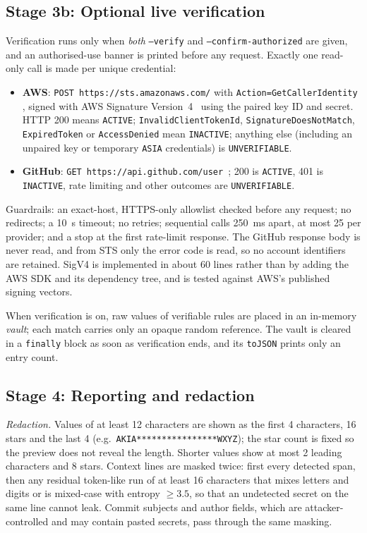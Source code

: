 \documentclass[conference]{IEEEtran}
\newcommand{\code}[1]{\texttt{#1}}
\begin{document}
\subsection{Stage 3b: Optional live verification}
Verification runs only when \emph{both} \code{--verify} and \code{--confirm-authorized} are given,
and an authorised-use banner is printed before any request. Exactly one read-only call is made per
unique credential:
\begin{itemize}
\item \textbf{AWS}: \code{POST https://sts.amazonaws.com/} with \code{Action=GetCallerIdentity}
  \cite{awssts}, signed with AWS Signature Version~4~\cite{awssigv4} using the paired key ID and
  secret. HTTP 200 means \code{ACTIVE}; \code{InvalidClientTokenId}, \code{SignatureDoesNotMatch},
  \code{ExpiredToken} or \code{AccessDenied} mean \code{INACTIVE}; anything else (including an
  unpaired key or temporary \code{ASIA} credentials) is \code{UNVERIFIABLE}.
\item \textbf{GitHub}: \code{GET https://api.github.com/user}~\cite{ghusers}; 200 is
  \code{ACTIVE}, 401 is \code{INACTIVE}, rate limiting and other outcomes are \code{UNVERIFIABLE}.
\end{itemize}
Guardrails: an exact-host, HTTPS-only allowlist checked before any request; no redirects; a 10~s
timeout; no retries; sequential calls 250~ms apart, at most 25 per provider; and a stop at the
first rate-limit response. The GitHub response body is never read, and from STS only the error
code is read, so no account identifiers are retained. SigV4 is implemented in about 60 lines rather
than by adding the AWS SDK and its dependency tree, and is tested against AWS's published signing
vectors.

When verification is on, raw values of verifiable rules are placed in an in-memory \emph{vault};
each match carries only an opaque random reference. The vault is cleared in a \code{finally} block
as soon as verification ends, and its \code{toJSON} prints only an entry count.

\subsection{Stage 4: Reporting and redaction}
\emph{Redaction.} Values of at least 12 characters are shown as the first 4 characters, 16 stars
and the last 4 (e.g.\ \code{AKIA****************WXYZ}); the star count is fixed so the preview does
not reveal the length. Shorter values show at most 2 leading characters and 8 stars. Context lines
are masked twice: first every detected span, then any residual token-like run of at least 16
characters that mixes letters and digits or is mixed-case with entropy $\geq 3.5$, so that an
undetected secret on the same line cannot leak. Commit subjects and author fields, which are
attacker-controlled and may contain pasted secrets, pass through the same masking.
\end{document}
